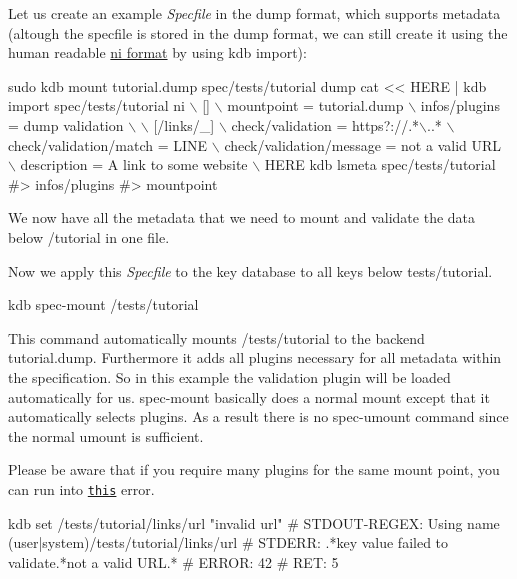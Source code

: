 Let us create an example {\itshape Specfile} in the dump format, which supports metadata (altough the specfile is stored in the dump format, we can still create it using the human readable \hyperlink{md_src_plugins_ni_README_src_plugins_ni_README_md}{ni format} by using {\ttfamily kdb import})\+:


\begin{DoxyCode}
sudo kdb mount tutorial.dump spec/tests/tutorial dump
cat << HERE | kdb import spec/tests/tutorial ni  \(\backslash\)
[]                                         \(\backslash\)
 mountpoint = tutorial.dump                \(\backslash\)
 infos/plugins = dump validation           \(\backslash\)
                                           \(\backslash\)
[/links/\_]                                 \(\backslash\)
check/validation = https?://.*\(\backslash\)..*         \(\backslash\)
check/validation/match = LINE              \(\backslash\)
check/validation/message = not a valid URL \(\backslash\)
description = A link to some website       \(\backslash\)
HERE
kdb lsmeta spec/tests/tutorial
#> infos/plugins
#> mountpoint
\end{DoxyCode}


We now have all the metadata that we need to mount and validate the data below {\ttfamily /tutorial} in one file.

Now we apply this {\itshape Specfile} to the key database to all keys below {\ttfamily tests/tutorial}.


\begin{DoxyCode}
kdb spec-mount /tests/tutorial
\end{DoxyCode}


This command automatically mounts {\ttfamily /tests/tutorial} to the backend {\ttfamily tutorial.\+dump}. Furthermore it adds all plugins necessary for all metadata within the specification. So in this example the validation plugin will be loaded automatically for us. {\ttfamily spec-\/mount} basically does a normal mount except that it automatically selects plugins. As a result there is no {\ttfamily spec-\/umount} command since the normal {\ttfamily umount} is sufficient.

Please be aware that if you require many plugins for the same mount point, you can run into \href{https://github.com/ElektraInitiative/libelektra/issues/2133}{\tt this} error.


\begin{DoxyCode}
kdb set /tests/tutorial/links/url "invalid url"
# STDOUT-REGEX: Using name (user|system)/tests/tutorial/links/url
# STDERR: .*key value failed to validate.*not a valid URL.*
# ERROR:  42
# RET:    5
\end{DoxyCode}


